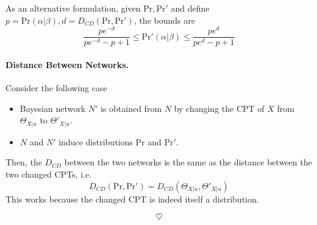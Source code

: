 \documentclass[11pt]{article}
\newcommand{\pr}{\mathrm{Pr}}
\begin{document}
As an alternative formulation, given $\pr, \pr'$ and define $p = \pr(\alpha | \beta), d = D_{CD}(\pr, \pr')$, the bounds are 
\begin{equation}
	\frac{pe^{-d}}{pe^{-d} - p + 1} \leq \pr'(\alpha | \beta) \leq \frac{pe^d}{pe^d - p + 1}
\end{equation} 

\paragraph{Distance Between Networks.} Consider the following case
\begin{itemize}
	\item Bayesian network $N'$ is obtained from $N$ by changing the CPT of $X$ from $\Theta_{X | u}$ to $\Theta'_{X | u}$. 
	\item $N$ and $N'$ induce distributions $\pr$ and $\pr'$. 
\end{itemize}
Then, the $D_{CD}$ between the two networks is the same as the distance between the two changed CPTs, i.e. 
\begin{equation}
	D_{CD} (\pr, \pr') = D_{CD} (\Theta_{X | u}, \Theta'_{X | u})
\end{equation}
This works because the changed CPT is indeed itself a distribution. 



















\begin{equation*}
	\heartsuit
\end{equation*}
\end{document}
